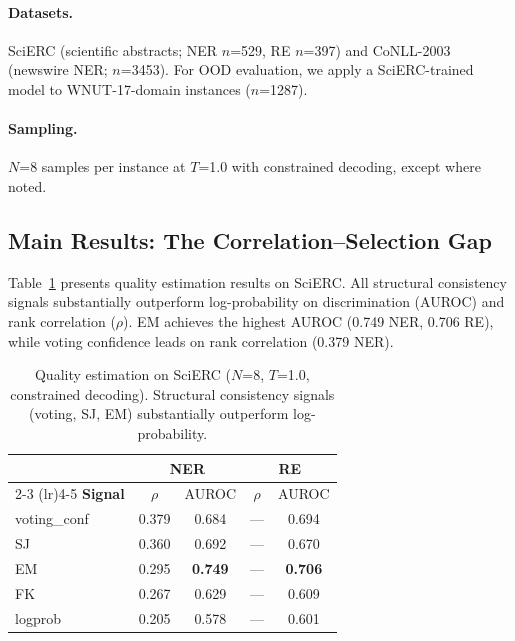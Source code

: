 \documentclass[11pt,a4paper]{article}
\begin{document}
\paragraph{Datasets.} SciERC \cite{luan2018multi} (scientific abstracts; NER $n$=529, RE $n$=397) and CoNLL-2003 \cite{tjong2003introduction} (newswire NER; $n$=3453). For OOD evaluation, we apply a SciERC-trained model to WNUT-17-domain instances ($n$=1287).

\paragraph{Sampling.} $N$=8 samples per instance at $T$=1.0 with constrained decoding, except where noted.

\subsection{Main Results: The Correlation--Selection Gap}
\label{sec:main_results}

Table~\ref{tab:qe_main} presents quality estimation results on SciERC. All structural consistency signals substantially outperform log-probability on discrimination (AUROC) and rank correlation ($\rho$). EM achieves the highest AUROC (0.749 NER, 0.706 RE), while voting confidence leads on rank correlation (0.379 NER).

\begin{table}[t]
\centering
\small
\begin{tabular}{l cc cc}
\toprule
& \multicolumn{2}{c}{\textbf{NER}} & \multicolumn{2}{c}{\textbf{RE}} \\
\cmidrule(lr){2-3} \cmidrule(lr){4-5}
\textbf{Signal} & $\rho$ & AUROC & $\rho$ & AUROC \\
\midrule
voting\_conf & 0.379 & 0.684 & --- & 0.694 \\
SJ           & 0.360 & 0.692 & --- & 0.670 \\
EM           & 0.295 & \textbf{0.749} & --- & \textbf{0.706} \\
FK           & 0.267 & 0.629 & --- & 0.609 \\
logprob      & 0.205 & 0.578 & --- & 0.601 \\
\bottomrule
\end{tabular}
\caption{Quality estimation on SciERC ($N$=8, $T$=1.0, constrained decoding). Structural consistency signals (voting, SJ, EM) substantially outperform log-probability.}
\label{tab:qe_main}
\end{table}
\end{document}
